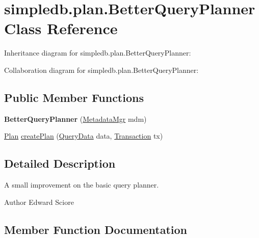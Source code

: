 \hypertarget{classsimpledb_1_1plan_1_1BetterQueryPlanner}{}\section{simpledb.\+plan.\+Better\+Query\+Planner Class Reference}
\label{classsimpledb_1_1plan_1_1BetterQueryPlanner}


Inheritance diagram for simpledb.\+plan.\+Better\+Query\+Planner\+:


Collaboration diagram for simpledb.\+plan.\+Better\+Query\+Planner\+:
\subsection*{Public Member Functions}
\begin{DoxyCompactItemize}
\item 
\mbox{\label{classsimpledb_1_1plan_1_1BetterQueryPlanner_a5344e2fad6e156fea7cf345e00b2a113}} 
{\bfseries Better\+Query\+Planner} (\hyperlink{classsimpledb_1_1metadata_1_1MetadataMgr}{Metadata\+Mgr} mdm)
\item 
\hyperlink{interfacesimpledb_1_1plan_1_1Plan}{Plan} \hyperlink{classsimpledb_1_1plan_1_1BetterQueryPlanner_a887ebdcc02b0de4a2bc8545cce7efa20}{create\+Plan} (\hyperlink{classsimpledb_1_1parse_1_1QueryData}{Query\+Data} data, \hyperlink{classsimpledb_1_1tx_1_1Transaction}{Transaction} tx)
\end{DoxyCompactItemize}


\subsection{Detailed Description}
A small improvement on the basic query planner. \begin{DoxyAuthor}{Author}
Edward Sciore 
\end{DoxyAuthor}


\subsection{Member Function Documentation}
\mbox{\label{classsimpledb_1_1plan_1_1BetterQueryPlanner_a887ebdcc02b0de4a2bc8545cce7efa20}} 
